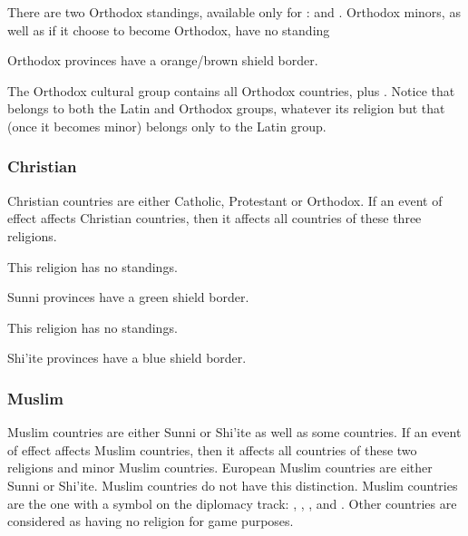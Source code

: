 \aparag There are two Orthodox standings, available only for \RUS:
 and .
\bparag Orthodox minors, as well as \POL if it choose to become Orthodox, have
no standing

\aparag Orthodox provinces have a orange/brown shield border.

\aparag The Orthodox cultural group contains all Orthodox countries, plus
\POL.
\bparag Notice that \POL belongs to both the Latin and Orthodox groups,
whatever its religion but that \paysPologne (once it becomes minor) belongs
only to the Latin group.


\subsubsection{Christian}
\aparag Christian countries are either Catholic, Protestant or Orthodox.
\bparag If an event of effect affects Christian countries, then it affects all
countries of these three religions.

\aparag This religion has no standings.

\aparag Sunni provinces have a green shield border.

\aparag This religion has no standings.

\aparag Shi'ite provinces have a blue shield border.


\subsubsection{Muslim}
\aparag Muslim countries are either Sunni or Shi'ite as well as some \ROTW
countries.
\bparag If an event of effect affects Muslim countries, then it affects all
countries of these two religions and \ROTW minor Muslim countries.
\bparag European Muslim countries are either Sunni or Shi'ite. \ROTW Muslim
countries do not have this distinction.
\bparag \ROTW Muslim countries are the one with a \Xsunnite symbol on the
\ROTW diplomacy track: \paysAden, \paysOman, \paysSoudan, \paysGujerat and
. Other \ROTW countries are considered as having no religion for
game purposes.

